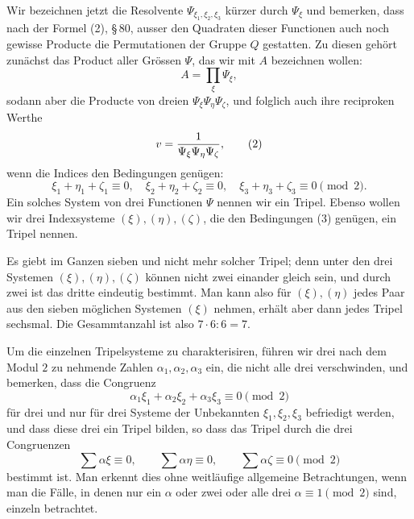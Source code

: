 \documentclass[11pt]{article}
\begin{document}
Wir bezeichnen jetzt die Resolvente $\Psi_{\xi_1,\xi_2,\xi_3}$ kürzer durch $\Psi_\xi$ und bemerken, dass nach der Formel (2), \S\,80, ausser den Quadraten dieser Functionen auch noch gewisse Producte die Permutationen der Gruppe $Q$ gestatten. Zu diesen gehört zunächst das Product aller Grössen $\Psi$, das wir mit $A$ bezeichnen wollen:
\begin{equation}
 A=\prod_\xi \Psi_\xi,
 \tag{1}
\end{equation}
sodann aber die Producte von dreien $\Psi_\xi\Psi_\eta\Psi_\zeta$, und folglich auch ihre reciproken Werthe
\begin{equation}
 v={1\over \Psi_\xi\Psi_\eta\Psi_\zeta},
 \tag{2}
\end{equation}
wenn die Indices den Bedingungen genügen:
\begin{equation}
 \xi_1+\eta_1+\zeta_1\equiv 0,
 \quad \xi_2+\eta_2+\zeta_2\equiv 0,
 \quad \xi_3+\eta_3+\zeta_3\equiv 0\pmod 2.
 \tag{3}
\end{equation}
Ein solches System von drei Functionen $\Psi$ nennen wir ein Tripel. Ebenso wollen wir drei Indexsysteme $(\xi),(\eta),(\zeta)$, die den Bedingungen (3) genügen, ein Tripel nennen.

Es giebt im Ganzen sieben und nicht mehr solcher Tripel; denn unter den drei Systemen $(\xi),(\eta),(\zeta)$ können nicht zwei einander gleich sein, und durch zwei ist das dritte eindeutig bestimmt. Man kann also für $(\xi),(\eta)$ jedes Paar aus den sieben möglichen Systemen $(\xi)$ nehmen, erhält aber dann jedes Tripel sechsmal. Die Gesammtanzahl ist also $7\cdot 6:6=7$.

Um die einzelnen Tripelsysteme zu charakterisiren, führen wir drei nach dem Modul $2$ zu nehmende Zahlen $\alpha_1,\alpha_2,\alpha_3$ ein, die nicht alle drei verschwinden, und bemerken, dass die Congruenz
\begin{equation}
 \alpha_1\xi_1+\alpha_2\xi_2+\alpha_3\xi_3\equiv 0\pmod 2
 \tag{4}
\end{equation}
für drei und nur für drei Systeme der Unbekannten $\xi_1,\xi_2,\xi_3$ befriedigt werden, und dass diese drei ein Tripel bilden, so dass das Tripel durch die drei Congruenzen
\begin{equation}
 \sum\alpha\xi\equiv 0,
 \qquad \sum\alpha\eta\equiv 0,
 \qquad \sum\alpha\zeta\equiv 0\pmod 2
 \tag{5}
\end{equation}
bestimmt ist. Man erkennt dies ohne weitläufige allgemeine Betrachtungen, wenn man die Fälle, in denen nur ein $\alpha$ oder zwei oder alle drei $\alpha\equiv1\pmod2$ sind, einzeln betrachtet.
\end{document}
